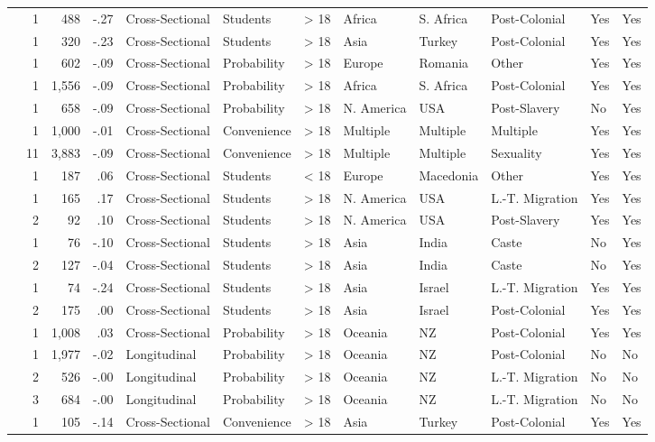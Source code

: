 \documentclass[10pt, letterpaper]{article}
\begin{document}
\begin{landscape}
\begin{xltabular}{650pt}{Xrrrllrlllll}
 \cite{284} & 1 & 488 & -.27 & Cross-Sectional & Students & > 18 & Africa & S. Africa & Post-Colonial & Yes & Yes\\
\cite{1614} & 1 & 320 & -.23 & Cross-Sectional & Students & > 18 & Asia & Turkey & Post-Colonial & Yes & Yes\\
\cite{3205} & 1 & 602 & -.09 & Cross-Sectional & Probability & > 18 & Europe & Romania & Other & Yes & Yes\\
\cite{1386} & 1 & 1,556 & -.09 & Cross-Sectional & Probability & > 18 & Africa & S. Africa & Post-Colonial & Yes & Yes\\
\cite{1549} & 1 & 658 & -.09 & Cross-Sectional & Probability & > 18 & N. America & USA & Post-Slavery & No & Yes\\
\cite{3054} & 1 & 1,000 & -.01 & Cross-Sectional & Convenience & > 18 & Multiple & Multiple & Multiple & Yes & Yes\\
 & 11 & 3,883 & -.09 & Cross-Sectional & Convenience & > 18 & Multiple & Multiple & Sexuality & Yes & Yes\\
\cite{856} & 1 & 187 & .06 & Cross-Sectional & Students & < 18 & Europe & Macedonia & Other & Yes & Yes\\
\cite{1042} & 1 & 165 & .17 & Cross-Sectional & Students & > 18 & N. America & USA & L.-T. Migration & Yes & Yes\\
 & 2 & 92 & .10 & Cross-Sectional & Students & > 18 & N. America & USA & Post-Slavery & Yes & Yes\\
\cite{2380} & 1 & 76 & -.10 & Cross-Sectional & Students & > 18 & Asia & India & Caste & No & Yes\\
 & 2 & 127 & -.04 & Cross-Sectional & Students & > 18 & Asia & India & Caste & No & Yes\\
\cite{4005} & 1 & 74 & -.24 & Cross-Sectional & Students & > 18 & Asia & Israel & L.-T. Migration & Yes & Yes\\
\cite{813} & 2 & 175 & .00 & Cross-Sectional & Students & > 18 & Asia & Israel & Post-Colonial & Yes & Yes\\
\cite{1695} & 1 & 1,008 & .03 & Cross-Sectional & Probability & > 18 & Oceania & NZ & Post-Colonial & Yes & Yes\\
\cite{2381} & 1 & 1,977 & -.02 & Longitudinal & Probability & > 18 & Oceania & NZ & Post-Colonial & No & No\\
 & 2 & 526 & -.00 & Longitudinal & Probability & > 18 & Oceania & NZ & L.-T. Migration & No & No\\
 & 3 & 684 & -.00 & Longitudinal & Probability & > 18 & Oceania & NZ & L.-T. Migration & No & No\\
\cite{286} & 1 & 105 & -.14 & Cross-Sectional & Convenience & > 18 & Asia & Turkey & Post-Colonial & Yes & Yes\\
 
\end{xltabular}
 
\end{landscape}

\printbibliography
\end{document}
